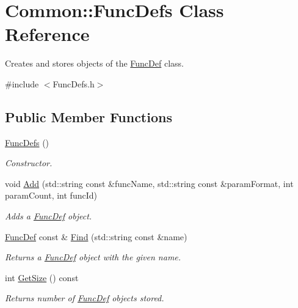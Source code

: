 \hypertarget{class_common_1_1_func_defs}{\section{Common\-:\-:Func\-Defs Class Reference}
\label{class_common_1_1_func_defs}
}


Creates and stores objects of the \hyperlink{class_common_1_1_func_def}{Func\-Def} class.  




{\ttfamily \#include $<$Func\-Defs.\-h$>$}

\subsection*{Public Member Functions}
\begin{DoxyCompactItemize}
\item 
\hyperlink{class_common_1_1_func_defs_a2e75ea4865aa8274523be4b9fdc8b428}{Func\-Defs} ()
\begin{DoxyCompactList}\small\item\em Constructor. \end{DoxyCompactList}\item 
void \hyperlink{class_common_1_1_func_defs_ab849214cd5d440ab86372d724af154d3}{Add} (std\-::string const \&func\-Name, std\-::string const \&param\-Format, int param\-Count, int func\-Id)
\begin{DoxyCompactList}\small\item\em Adds a \hyperlink{class_common_1_1_func_def}{Func\-Def} object. \end{DoxyCompactList}\item 
\hyperlink{class_common_1_1_func_def}{Func\-Def} const \& \hyperlink{class_common_1_1_func_defs_a72003c3b38c4be15e493194dc1229386}{Find} (std\-::string const \&name)
\begin{DoxyCompactList}\small\item\em Returns a \hyperlink{class_common_1_1_func_def}{Func\-Def} object with the given name. \end{DoxyCompactList}\item 
\hypertarget{class_common_1_1_func_defs_a69600305351b797fa663eb03063cc615}{int \hyperlink{class_common_1_1_func_defs_a69600305351b797fa663eb03063cc615}{Get\-Size} () const }\label{class_common_1_1_func_defs_a69600305351b797fa663eb03063cc615}

\begin{DoxyCompactList}\small\item\em Returns number of \hyperlink{class_common_1_1_func_def}{Func\-Def} objects stored. \end{DoxyCompactList}\end{DoxyCompactItemize}


